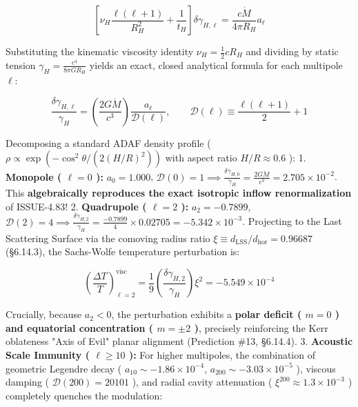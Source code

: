 \documentclass[11pt,a4paper]{article}
\theoremstyle{definition}
\theoremstyle{remark}
\begin{document}
\begin{equation}
\left[ \nu_H \frac{\ell(\ell + 1)}{R_H^2} + \frac{1}{t_H} \right] \delta\gamma_{H, \ell} = \frac{c \dot{M}}{4\pi R_H} a_\ell
\end{equation}


Substituting the kinematic viscosity identity $\nu_H = \frac{1}{2} c R_H$ and dividing by static tension $\gamma_H = \frac{c^4}{8\pi G R_H}$ yields an exact, closed analytical formula for each multipole $\ell$:


\begin{equation}
\frac{\delta\gamma_{H, \ell}}{\gamma_H} = \left( \frac{2 G \dot{M}}{c^3} \right) \frac{a_\ell}{\mathcal{D}(\ell)}, \qquad \mathcal{D}(\ell) \equiv \frac{\ell(\ell + 1)}{2} + 1
\end{equation}


Decomposing a standard ADAF density profile ( $\rho \propto \exp(-\cos^2\theta / (2 (H/R)^2))$ with aspect ratio $H/R \approx 0.6$ ):
1. \textbf{Monopole ( $\ell = 0$ ):} $a_0 = 1.000$, $\mathcal{D}(0) = 1 \implies \frac{\delta\gamma_{H, 0}}{\gamma_H} = \frac{2 G \dot{M}}{c^3} = 2.705 \times 10^{-2}$. This \textbf{algebraically reproduces the exact isotropic inflow renormalization} of ISSUE-4.83!
2. \textbf{Quadrupole ( $\ell = 2$ ):} $a_2 = -0.7899$, $\mathcal{D}(2) = 4 \implies \frac{\delta\gamma_{H, 2}}{\gamma_H} = \frac{-0.7899}{4} \times 0.02705 = -5.342 \times 10^{-3}$.
Projecting to the Last Scattering Surface via the comoving radius ratio $\xi \equiv d_{\text{LSS}}/d_{\text{hor}} = 0.96687$ (\S 6.14.3), the Sachs-Wolfe temperature perturbation is:


\begin{equation}
\left( \frac{\Delta T}{T} \right)_{\ell=2}^{\text{visc}} = \frac{1}{9} \left( \frac{\delta\gamma_{H, 2}}{\gamma_H} \right) \xi^2 = -5.549 \times 10^{-4}
\end{equation}


Crucially, because $a_2 < 0$, the perturbation exhibits a \textbf{polar deficit ( $m = 0$ ) and equatorial concentration ( $m = \pm 2$ )}, precisely reinforcing the Kerr oblateness "Axis of Evil" planar alignment (Prediction \#13, \S 6.14.4).
3. \textbf{Acoustic Scale Immunity ( $\ell \ge 10$ ):} For higher multipoles, the combination of geometric Legendre decay ( $a_{10} \sim -1.86 \times 10^{-4}$, $a_{200} \sim -3.03 \times 10^{-5}$ ), viscous damping ( $\mathcal{D}(200) = 20101$ ), and radial cavity attenuation ( $\xi^{200} \approx 1.3 \times 10^{-3}$ ) completely quenches the modulation:
\end{document}
